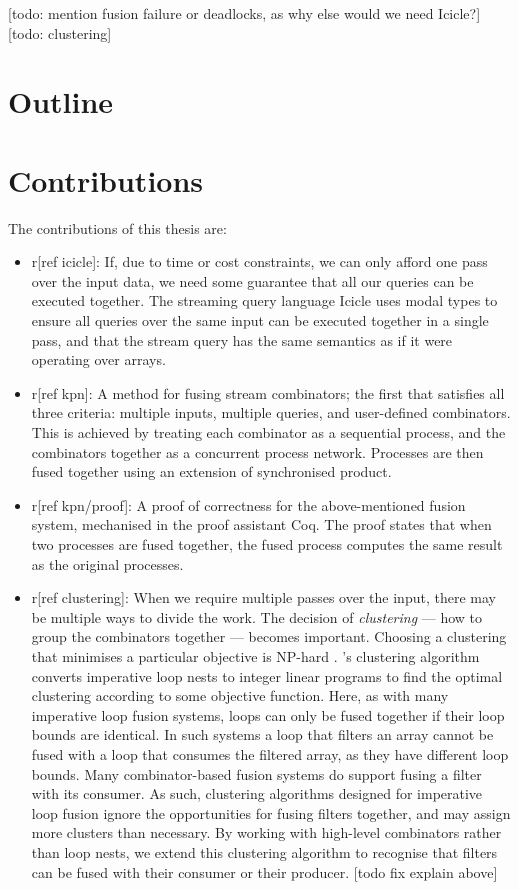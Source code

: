 [todo: mention fusion failure or deadlocks, as why else would we need Icicle?]
[todo: clustering]

\section{Outline}
\section{Contributions}

The contributions of this thesis are:

\begin{itemize}
\item
r[ref icicle]:
If, due to time or cost constraints, we can only afford one pass over the input data, we need some guarantee that all our queries can be executed together.
The streaming query language Icicle uses modal types to ensure all queries over the same input can be executed together in a single pass, and that the stream query has the same semantics as if it were operating over arrays.

\item
r[ref kpn]:
A method for fusing stream combinators; the first that satisfies all three criteria: multiple inputs, multiple queries, and user-defined combinators.
This is achieved by treating each combinator as a sequential process, and the combinators together as a concurrent process network.
Processes are then fused together using an extension of synchronised product.

\item
r[ref kpn/proof]:
A proof of correctness for the above-mentioned fusion system, mechanised in the proof assistant Coq.
The proof states that when two processes are fused together, the fused process computes the same result as the original processes.

\item
r[ref clustering]:
When we require multiple passes over the input, there may be multiple ways to divide the work.
The decision of \emph{clustering} --- how to group the combinators together --- becomes important.
Choosing a clustering that minimises a particular objective is NP-hard \cite{darte1999complexity}.
\cite{megiddo1998optimal}'s clustering algorithm converts imperative loop nests to integer linear programs to find the optimal clustering according to some objective function.
Here, as with many imperative loop fusion systems, loops can only be fused together if their loop bounds are identical.
In such systems a loop that filters an array cannot be fused with a loop that consumes the filtered array, as they have different loop bounds.
Many combinator-based fusion systems do support fusing a filter with its consumer.
As such, clustering algorithms designed for imperative loop fusion ignore the opportunities for fusing filters together, and may assign more clusters than necessary.
By working with high-level combinators rather than loop nests, we extend this clustering algorithm to recognise that filters can be fused with their consumer or their producer.
[todo fix explain above]
\end{itemize}



